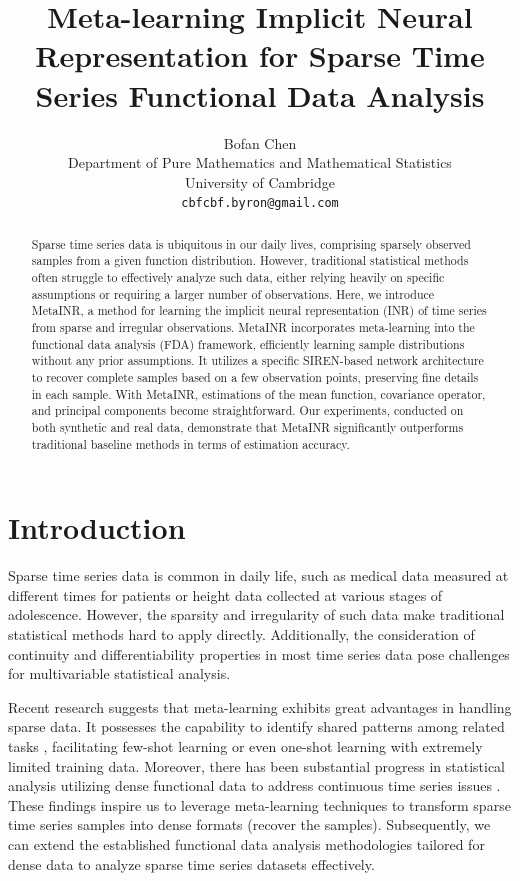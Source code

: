 \documentclass{article}
\title{Meta-learning Implicit Neural Representation for Sparse Time Series Functional Data Analysis}
\author{%
  Bofan Chen\\
  Department of Pure Mathematics and Mathematical Statistics\\
  University of Cambridge\\
  \texttt{cbfcbf.byron@gmail.com} \\}
\begin{document}
\maketitle

\begin{abstract}
  Sparse time series data is ubiquitous in our daily lives, comprising sparsely observed samples from a given function distribution.
  However, traditional statistical methods often struggle to effectively analyze such data, either relying heavily on specific assumptions or requiring a larger number of observations.  Here, we introduce MetaINR, a method for learning the implicit neural representation (INR) of time series from sparse and irregular observations.
  MetaINR incorporates meta-learning into the functional data analysis (FDA) framework, 
  efficiently learning sample distributions without any prior assumptions.
  It utilizes a specific SIREN-based network architecture to recover complete samples based on a few observation points, preserving fine details in each sample. 
  With MetaINR, estimations of the mean function, covariance operator, and principal components become straightforward.
  Our experiments, conducted on both synthetic and real data, demonstrate that MetaINR significantly outperforms traditional baseline methods in terms of estimation accuracy.
\end{abstract}

\section{Introduction}
Sparse time series data is common in daily life, such as medical data measured at different times for patients or height data collected at various stages of adolescence. 
However, the sparsity and irregularity of such data make traditional statistical methods hard to apply directly. 
Additionally, the consideration of continuity and differentiability properties in most time series data pose challenges for multivariable statistical analysis.

Recent research suggests that meta-learning \cite{finn2017model,hospedales2021meta,beck2023survey} exhibits great advantages in handling sparse data. 
It possesses the capability to identify shared patterns among related tasks \cite{raghu2019rapid}, 
facilitating few-shot learning or even one-shot learning \cite{sun2019meta} with extremely limited training data. 
Moreover, there has been substantial progress in statistical analysis utilizing dense functional data to address continuous time series issues \cite{wang2016functional}. 
These findings inspire us to leverage meta-learning techniques to transform sparse time series samples into dense formats (recover the samples).
Subsequently, we can extend the established functional data analysis methodologies tailored for dense data to analyze sparse time series datasets effectively.
\end{document}

